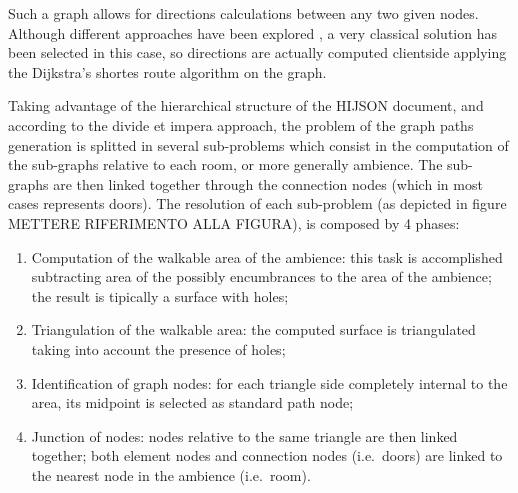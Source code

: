 \documentclass{sig-alternate}
\begin{document}
Such a graph allows for directions calculations between any two given
nodes. Although different approaches have been explored \cite{6999103}, 
a very classical solution has been selected in this case, so directions 
are actually computed clientside applying the Dijkstra's shortes route 
algorithm on the graph. 

Taking advantage of the hierarchical structure of the HIJSON document,
and according to the divide et impera approach, the problem of the graph
paths generation is splitted in several sub-problems which consist in
the computation of the sub-graphs relative to each room, or more
generally ambience. The sub-graphs are then linked together through the
connection nodes (which in most cases represents doors). The resolution
of each sub-problem (as depicted in figure METTERE RIFERIMENTO ALLA
FIGURA), is composed by 4 phases:

\begin{enumerate}
\def\labelenumi{\arabic{enumi}.}
\itemsep1pt\parskip0pt
\item
 Computation of the walkable area of the ambience: this task is
 accomplished subtracting area of the possibly encumbrances to the area
 of the ambience; the result is tipically a surface with holes;
\item
 Triangulation of the walkable area: the computed surface is
 triangulated taking into account the presence of holes;
\item
 Identification of graph nodes: for each triangle side completely
 internal to the area, its midpoint is selected as standard path node;
\item
 Junction of nodes: nodes relative to the same triangle are then linked
 together; both element nodes and connection nodes (i.e.~doors) are
 linked to the nearest node in the ambience (i.e.~room).
\end{enumerate}
\end{document}
